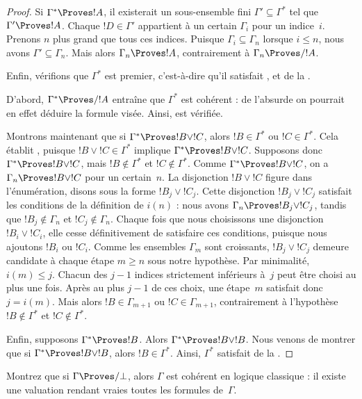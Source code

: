 \documentclass[../../../include/open-logic-section]{subfiles}
\begin{document}
\begin{proof}
  Si $\Gamma^* \Proves !A$, il existerait un sous-ensemble fini
  $\Gamma' \subseteq \Gamma^*$ tel que $\Gamma' \Proves !A$.
  Chaque $!D \in \Gamma'$ appartient à un certain $\Gamma_i$ pour un
  indice~$i$.
  Prenons $n$ plus grand que tous ces indices. Puisque
  $\Gamma_i \subseteq \Gamma_n$ lorsque $i \le n$, nous avons
  $\Gamma' \subseteq \Gamma_n$. Mais alors $\Gamma_n \Proves !A$,
  contrairement à $\Gamma_n \Proves/ !A$.

  Enfin, vérifions que $\Gamma^*$ est premier, c'est-à-dire qu'il
  satisfait ,  et
   de la .

  D'abord, $\Gamma^* \Proves/ !A$ entraîne que $\Gamma^*$ est
  cohérent : de l'absurde on pourrait en effet déduire la formule visée.
  Ainsi,  est vérifiée.

  Montrons maintenant que si $\Gamma^* \Proves !B \lor !C$, alors
  $!B \in \Gamma^*$ ou $!C \in \Gamma^*$. Cela établit
  , puisque $!B \lor !C \in \Gamma^*$ implique
  $\Gamma^* \Proves !B \lor !C$. Supposons donc
  $\Gamma^* \Proves !B \lor !C$, mais $!B \notin \Gamma^*$ et
  $!C \notin \Gamma^*$. Comme $\Gamma^* \Proves !B \lor !C$,
  on a $\Gamma_n \Proves !B \lor !C$ pour un certain~$n$.
  La disjonction $!B \lor !C$ figure dans l'énumération, disons
  sous la forme $!B_j \lor !C_j$. Cette disjonction
  $!B_j \lor !C_j$ satisfait les conditions de
  la définition de $i(n)$ : nous avons
  $\Gamma_n \Proves !B_j \lor !C_j$, tandis que
  $!B_j \notin \Gamma_n$ et $!C_j \notin \Gamma_n$.
  Chaque fois que nous choisissons une disjonction
  $!B_i \lor !C_i$, elle cesse définitivement de satisfaire ces
  conditions, puisque nous ajoutons $!B_i$ ou $!C_i$. Comme les
  ensembles $\Gamma_m$ sont croissants, $!B_j \lor !C_j$ demeure
  candidate à chaque étape $m\ge n$ sous notre hypothèse.
  Par minimalité, $i(m)\le j$. Chacun des $j-1$ indices strictement
  inférieurs à~$j$ peut être choisi au plus une fois. Après au plus
  $j-1$ de ces choix, une étape~$m$ satisfait
  donc $j = i(m)$. Mais alors $!B \in \Gamma_{m+1}$ ou
  $!C \in \Gamma_{m+1}$, contrairement à l'hypothèse
  $!B \notin \Gamma^*$ et $!C \notin \Gamma^*$.

  Enfin, supposons $\Gamma^* \Proves !B$. Alors
  $\Gamma^* \Proves !B \lor !B$. Nous venons de montrer que si
  $\Gamma^* \Proves !B \lor !B$, alors $!B \in \Gamma^*$.
  Ainsi, $\Gamma^*$ satisfait  de la
  .
\end{proof}

\begin{prob}
Montrez que si $\Gamma \Proves/ \bot$, alors $\Gamma$ est cohérent
en logique classique : il existe une valuation rendant vraies toutes
les formules de~$\Gamma$.
\end{prob}
\end{document}
